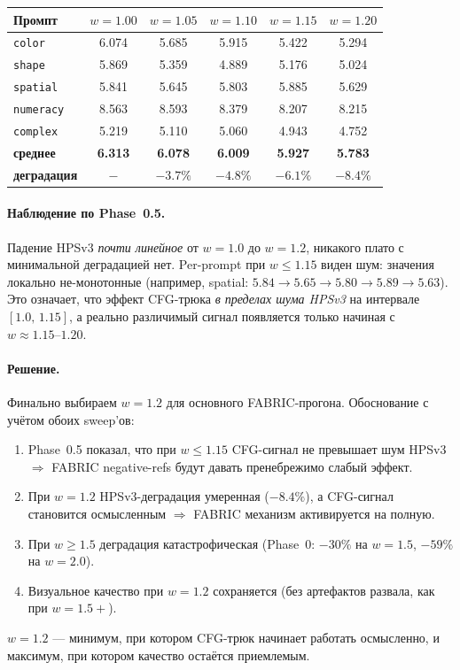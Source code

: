 \documentclass[11pt,a4paper]{article}
\begin{document}
\begin{center}
\begin{tabular}{lccccc}
\toprule
Промпт & $w=1.00$ & $w=1.05$ & $w=1.10$ & $w=1.15$ & $w=1.20$ \\
\midrule
\texttt{color} & 6.074 & 5.685 & 5.915 & 5.422 & 5.294 \\
\texttt{shape} & 5.869 & 5.359 & 4.889 & 5.176 & 5.024 \\
\texttt{spatial} & 5.841 & 5.645 & 5.803 & 5.885 & 5.629 \\
\texttt{numeracy} & 8.563 & 8.593 & 8.379 & 8.207 & 8.215 \\
\texttt{complex} & 5.219 & 5.110 & 5.060 & 4.943 & 4.752 \\
\midrule
\textbf{среднее} & \textbf{6.313} & \textbf{6.078} & \textbf{6.009} & \textbf{5.927} & \textbf{5.783} \\
\textbf{деградация} & $-$ & $-3.7\%$ & $-4.8\%$ & $-6.1\%$ & $-8.4\%$ \\
\bottomrule
\end{tabular}
\end{center}

\paragraph{Наблюдение по Phase~0.5.} Падение HPSv3 \emph{почти линейное}
от $w=1.0$ до $w=1.2$, никакого плато с минимальной деградацией нет.
Per-prompt при $w \le 1.15$ виден шум: значения локально не-монотонные
(например, spatial: $5.84 \to 5.65 \to 5.80 \to 5.89 \to 5.63$). Это
означает, что эффект CFG-трюка \emph{в пределах шума HPSv3} на интервале
$[1.0,\,1.15]$, а реально различимый сигнал появляется только начиная с
$w \approx 1.15\text{--}1.20$.

\paragraph{Решение.} Финально выбираем $\boxed{w = 1.2}$ для основного
FABRIC-прогона. Обоснование с учётом обоих sweep'ов:
\begin{enumerate}[leftmargin=2em,itemsep=2pt]
  \item Phase~0.5 показал, что при $w \le 1.15$ CFG-сигнал не превышает
        шум HPSv3 $\Rightarrow$ FABRIC negative-refs будут давать
        пренебрежимо слабый эффект.
  \item При $w=1.2$ HPSv3-деградация умеренная ($-8.4\%$), а CFG-сигнал
        становится осмысленным $\Rightarrow$ FABRIC механизм
        активируется на полную.
  \item При $w \ge 1.5$ деградация катастрофическая (Phase~0:
        $-30\%$ на $w=1.5$, $-59\%$ на $w=2.0$).
  \item Визуальное качество при $w=1.2$ сохраняется (без артефактов
        развала, как при $w=1.5+$).
\end{enumerate}
$w=1.2$ --- минимум, при котором CFG-трюк начинает работать
осмысленно, и максимум, при котором качество остаётся приемлемым.
\end{document}
